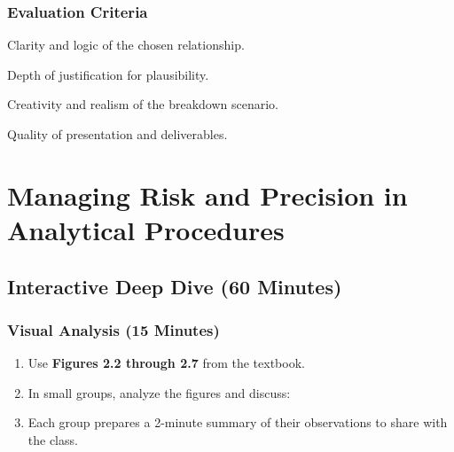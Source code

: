 \documentclass[11pt,a4paper,openany]{memoir}
\begin{document}
\subsection*{Evaluation Criteria}
\begin{compactitem}
    \item Clarity and logic of the chosen relationship.
    \item Depth of justification for plausibility.
    \item Creativity and realism of the breakdown scenario.
    \item Quality of presentation and deliverables.
\end{compactitem}


\chapter{Managing Risk and Precision in Analytical Procedures}

\section*{Interactive Deep Dive (60 Minutes)}

\subsection*{Visual Analysis (15 Minutes)}
\begin{enumerate}
    \item Use \textbf{Figures 2.2 through 2.7} from the textbook.
    \item In small groups, analyze the figures and discuss:
    \item Each group prepares a 2-minute summary of their observations to share with the class.
\end{enumerate}
\end{document}
